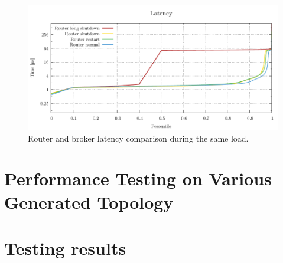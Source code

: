 \begin{figure}[h]
	\centering
	\includegraphics[width=1\linewidth]{obrazky-figures/charts-excel/agent_latency.pdf}
	\caption{Router and broker latency comparison during the same load.}
	\label{fig:agent_latency}
\end{figure}

\section{Performance Testing on Various Generated Topology}

\section{Testing results}
